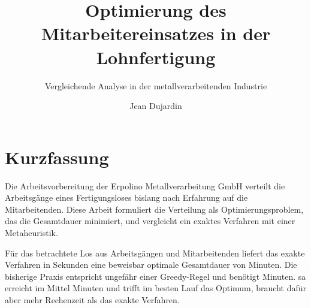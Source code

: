 \documentclass[german,libertinus,logo]{nxtthesis}
\title{Optimierung des Mitarbeitereinsatzes in der Lohnfertigung}
\subtitle{Vergleichende Analyse in der metallverarbeitenden Industrie}
\author{Jean Dujardin}
\begin{document}
\maketitle

\vspace*{\fill}
\begingroup
\setlength{\fboxrule}{1.5pt}
\setlength{\fboxsep}{12pt}
\noindent
{}
\endgroup
\vspace*{\fill}
\clearpage

\chapter*{Kurzfassung}

Die Arbeitsvorbereitung der
Erpolino Metallverarbeitung GmbH
verteilt die Arbeitsgänge eines Fertigungsloses bislang nach Erfahrung
auf die Mitarbeitenden. Diese Arbeit formuliert die Verteilung als
Optimierungsproblem, das die Gesamtdauer minimiert, und vergleicht ein
exaktes Verfahren mit einer Metaheuristik.

Für das betrachtete Los aus \ZahlAufgaben{} Arbeitsgängen und
\ZahlMitarbeiter{} Mitarbeitenden liefert das exakte Verfahren in
\MilpSekunden{} Sekunden eine beweisbar optimale Gesamtdauer von
\Optimum{} Minuten. Die bisherige Praxis entspricht ungefähr einer
Greedy-Regel und benötigt \MakespanGreedy{} Minuten. \ac{sa} erreicht im
Mittel \SaMittel{} Minuten und trifft im besten Lauf das Optimum,
braucht dafür aber mehr Rechenzeit als das exakte Verfahren.
\end{document}
